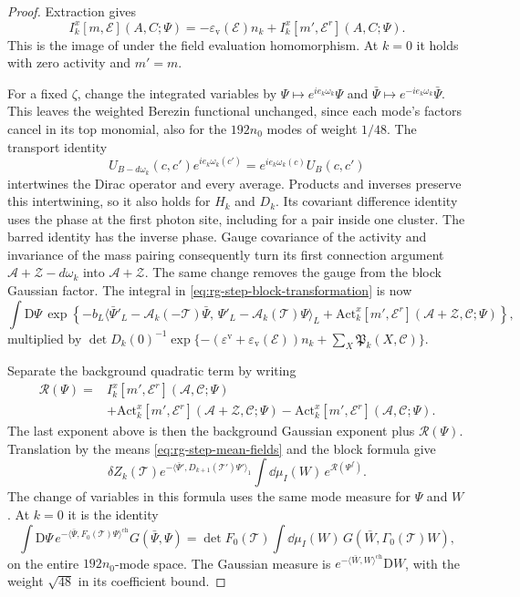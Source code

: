 \begin{proof}
Extraction gives
\[
 I_k^x[m,\mathscr E](A,C;\Psi)
      =-\varepsilon_{\mathrm v}(\mathscr E)n_k
                                      +I_k^x[m',\mathscr E^r](A,C;\Psi).
\]
This is the image of
 under the
field evaluation homomorphism. At $k=0$ it holds
with zero activity and $m'=m$.

For a fixed $\zeta$, change the integrated variables
by $\Psi\mapsto e^{ie_k\omega_k}\Psi$ and
$\bar\Psi\mapsto e^{-ie_k\omega_k}\bar\Psi$.
This leaves the weighted Berezin functional unchanged,
since each mode's factors cancel in its top monomial,
also for the $192n_0$ modes of weight $1/48$.
The transport identity
\[
 U_{B-d\omega_k}(c,c')e^{ie_k\omega_k(c')}
                       =e^{ie_k\omega_k(c)}U_B(c,c')
\]
intertwines the Dirac operator and every average.
Products and inverses preserve this intertwining,
so it also holds for $H_k$ and $D_k$.
Its covariant difference identity uses the phase
at the first photon site, including for a pair
inside one cluster. The barred identity has the
inverse phase. Gauge covariance of the activity
and invariance of the mass pairing consequently
turn its first connection argument
$\mathscr A+\mathscr Z-d\omega_k$ into
$\mathscr A+\mathscr Z$.
The same change removes the gauge from the block
Gaussian factor. The integral in
\eqref{eq:rg-step-block-transformation} is now
\[
 \int\mathrm D\Psi\,
       \exp\left\{-b_L
          \langle\bar\Psi'_L-\mathcal A_k(-\mathscr T)\bar\Psi,\,
                  \Psi'_L-\mathcal A_k(\mathscr T)\Psi\rangle_L
            +\mathrm{Act}_k^x[m',\mathscr E^r]
                    (\mathscr A+\mathscr Z,\mathscr C;\Psi)\right\},
\]
multiplied by
$\det D_k(0)^{-1}
\exp\{-(\varepsilon^{\mathrm v}+
\varepsilon_{\mathrm v}(\mathscr E))n_k+
\sum_X\mathfrak P_k(X,\mathscr C)\}$.

Separate the background quadratic term by writing
\[
 \begin{split}
 \mathcal R(\Psi)={}&I_k^x[m',\mathscr E^r](\mathscr A,\mathscr C;\Psi)\\
  &+\mathrm{Act}_k^x[m',\mathscr E^r]
                    (\mathscr A+\mathscr Z,\mathscr C;\Psi)
   -\mathrm{Act}_k^x[m',\mathscr E^r]
                    (\mathscr A,\mathscr C;\Psi).
 \end{split}
\]
The last exponent above is then the background
Gaussian exponent plus $\mathcal R(\Psi)$.
Translation by the means \eqref{eq:rg-step-mean-fields}
and the block formula 
give
\[
 \delta Z_k(\mathscr T)
   e^{-\langle\bar\Psi',D_{k+1}(\mathscr T')\Psi'\rangle_1}
          \int\dd\mu_I(W)\,e^{\mathcal R(\Psi^f)}.
\]
The change of variables in this formula uses the
same mode measure for $\Psi$ and $W$.
At $k=0$ it is the identity
\[
 \int\mathrm D\Psi\,e^{-\langle\bar\Psi,F_0(\mathscr T)\Psi\rangle^{\mathrm{ch}}}
       G(\bar\Psi,\Psi)
   =\det F_0(\mathscr T)
          \int\dd\mu_I(W)\,
                    G(\bar W,\Gamma_0(\mathscr T)W),
\]
on the entire $192n_0$-mode space.
The Gaussian measure is
$e^{-\langle\bar W,W\rangle^{\mathrm{ch}}}\mathrm DW$,
with the weight $\sqrt{48}$ in its coefficient bound.


\end{proof}
